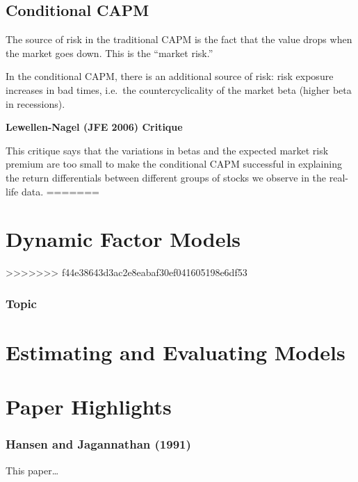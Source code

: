 \documentclass[
]{book}
\begin{document}
\hypertarget{conditional-capm}{%
\section{Conditional CAPM}\label{conditional-capm}}

The source of risk in the traditional CAPM is the fact that the value drops when the market goes down. This is the ``market risk.''

In the conditional CAPM, there is an additional source of risk: risk exposure increases in bad times, i.e.~the countercyclicality of the market beta (higher beta in recessions).

\textbf{Lewellen-Nagel (JFE 2006) Critique}

This critique says that the variations in betas and the expected market risk premium are too small to make the conditional CAPM successful in explaining the return differentials between different groups of stocks we observe in the real-life data.
=======
\hypertarget{dynamic-factor-models}{%
\chapter{Dynamic Factor Models}\label{dynamic-factor-models}}
>>>>>>> f44e38643d3ac2e8eabaf30ef041605198e6df53

\hypertarget{topic}{%
\subsection{Topic}\label{topic}}

\hypertarget{estimating-and-evaluating-models}{%
\chapter{Estimating and Evaluating Models}\label{estimating-and-evaluating-models}}

\hypertarget{paper-highlights}{%
\chapter{Paper Highlights}\label{paper-highlights}}

\hypertarget{hansen-and-jagannathan-1991}{%
\subsection{Hansen and Jagannathan (1991)}\label{hansen-and-jagannathan-1991}}

This paper\ldots{}
\end{document}

